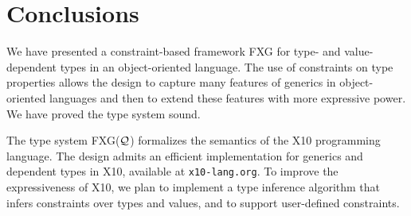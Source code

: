 \documentclass[preprint,nocopyrightspace,9pt]{sigplanconf}
\newcommand\Xten{{\sf X10}\xspace}
\newcommand\FXGL[1]{{\sf FXG(${\cal #1}$)}}
\def\FXG{{\sf FXG}\xspace}
\begin{document}
\section{Conclusions}
\label{sec:conclusions}

We have presented a constraint-based framework \FXG{} for type-
and value-dependent types in an object-oriented language.
%
The use of constraints on type properties allows the design to
capture many features of generics in object-oriented languages
and then to extend these features with more
expressive power.  We have proved the type system sound.

The type system \FXGL{Q} formalizes the semantics of the \Xten{}
programming language.  The design admits an efficient
implementation for generics and dependent types in \Xten{},
available at \texttt{x10-lang.org}.
To improve the expressiveness of \Xten{}, we plan to implement
a type inference algorithm that infers constraints over types
and values, and to support user-defined constraints.







% 
\end{document}
